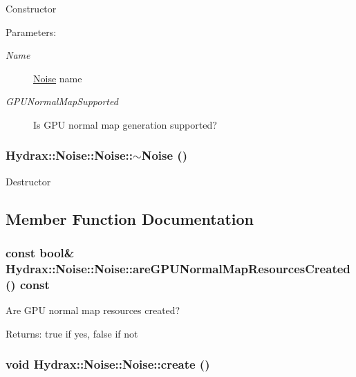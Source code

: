Constructor \begin{Desc}
\item[Parameters:]
\begin{description}
\item[{\em Name}]\hyperlink{class_hydrax_1_1_noise_1_1_noise}{Noise} name \item[{\em GPUNormalMapSupported}]Is GPU normal map generation supported? \end{description}
\end{Desc}
\hypertarget{class_hydrax_1_1_noise_1_1_noise_4ff5ce1a68da081f11015cdc4b417f15}{
\subsubsection[{$\sim$Noise}]{\setlength{\rightskip}{0pt plus 5cm}Hydrax::Noise::Noise::$\sim$Noise ()}}
\label{class_hydrax_1_1_noise_1_1_noise_4ff5ce1a68da081f11015cdc4b417f15}


Destructor 

\subsection{Member Function Documentation}
\hypertarget{class_hydrax_1_1_noise_1_1_noise_e2260556005e5a5eaebae94d936b60c0}{
\subsubsection[{areGPUNormalMapResourcesCreated}]{\setlength{\rightskip}{0pt plus 5cm}const bool\& Hydrax::Noise::Noise::areGPUNormalMapResourcesCreated () const}}
\label{class_hydrax_1_1_noise_1_1_noise_e2260556005e5a5eaebae94d936b60c0}


Are GPU normal map resources created? \begin{Desc}
\item[Returns:]true if yes, false if not \end{Desc}
\hypertarget{class_hydrax_1_1_noise_1_1_noise_be9cf8765feed765e6a35b0779125f6a}{
\subsubsection[{create}]{\setlength{\rightskip}{0pt plus 5cm}void Hydrax::Noise::Noise::create ()}}
\label{class_hydrax_1_1_noise_1_1_noise_be9cf8765feed765e6a35b0779125f6a}


